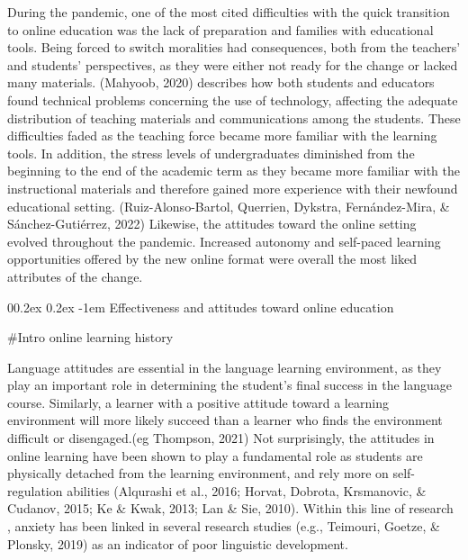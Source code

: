 \documentclass[
  man]{apa6}
\makeatletter
\let\oldparagraph\paragraph
\renewcommand{\paragraph}[1]{\oldparagraph{#1}\mbox{}}
\renewcommand{\paragraph}{\@startsection{paragraph}{4}{\parindent}%
  {0\baselineskip \@plus 0.2ex \@minus 0.2ex}%
  {-1em}%
  {\normalfont\normalsize\bfseries\itshape\typesectitle}}
\makeatother
\begin{document}
During the pandemic, one of the most cited difficulties with the quick transition to online education was the lack of preparation and families with educational tools.
Being forced to switch moralities had consequences, both from the teachers' and students' perspectives, as they were either not ready for the change or lacked many materials.
(Mahyoob, 2020) describes how both students and educators found technical problems concerning the use of technology, affecting the adequate distribution of teaching materials and communications among the students.
These difficulties faded as the teaching force became more familiar with the learning tools.
In addition, the stress levels of undergraduates diminished from the beginning to the end of the academic term as they became more familiar with the instructional materials and therefore gained more experience with their newfound educational setting.
(Ruiz-Alonso-Bartol, Querrien, Dykstra, Fernández-Mira, \& Sánchez-Gutiérrez, 2022)
Likewise, the attitudes toward the online setting evolved throughout the pandemic. Increased autonomy and self-paced learning opportunities offered by the new online format were overall the most liked attributes of the change.

\hypertarget{effectiveness-and-attitudes-toward-online-education}{%
\paragraph{Effectiveness and attitudes toward online education}\label{effectiveness-and-attitudes-toward-online-education}}

\#Intro online learning history

Language attitudes are essential in the language learning environment, as they play an important role in determining the student's final success in the language course.
Similarly, a learner with a positive attitude toward a learning environment will more likely succeed than a learner who finds the environment difficult or disengaged.(eg Thompson, 2021)
Not surprisingly, the attitudes in online learning have been shown to play a fundamental role as students are physically detached from the learning environment, and rely more on self-regulation abilities (Alqurashi et al., 2016; Horvat, Dobrota, Krsmanovic, \& Cudanov, 2015; Ke \& Kwak, 2013; Lan \& Sie, 2010).
Within this line of research , anxiety has been linked in several research studies (e.g., Teimouri, Goetze, \& Plonsky, 2019) as an indicator of poor linguistic development.
\end{document}
